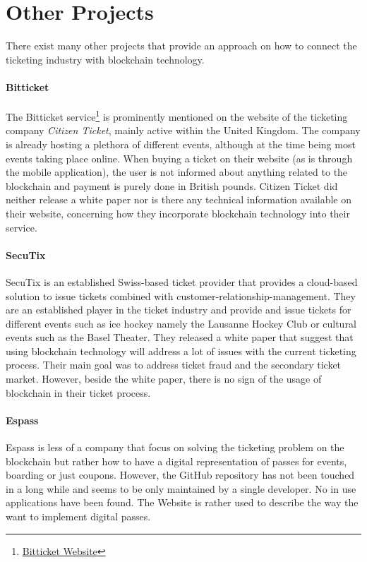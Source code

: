 \section{Other Projects}

There exist many other projects that provide an approach on how to connect the ticketing industry with blockchain technology.

\paragraph{Bitticket}
The Bitticket service\footnote{\href{https://www.bitticket.io}{Bitticket Website}} is prominently mentioned on the website of the ticketing company \textit{Citizen Ticket}, mainly active within the United Kingdom. The company is already hosting a plethora of different events, although at the time being most events taking place online. When buying a ticket on their website (as is through the mobile application), the user is not informed about anything related to the blockchain and payment is purely done in British pounds. Citizen Ticket did neither release a white paper nor is there any technical information available on their website, concerning how they incorporate blockchain technology into their service.

\paragraph{SecuTix}
SecuTix\cite{SECUTIX} is an established Swiss-based ticket provider that provides a cloud-based solution to issue tickets combined with customer-relationship-management. They are an established player in the ticket industry and provide and issue tickets for different events such as ice hockey namely the Lausanne Hockey Club or cultural events such as the Basel Theater. They released a white paper that suggest that using blockchain technology will address a lot of issues with the current ticketing process. Their main goal was to address ticket fraud and the secondary ticket market. However, beside the white paper, there is no sign of the usage of blockchain in their ticket process.

\paragraph{Espass} 
Espass\cite{espass} is less of a company that focus on solving the ticketing problem on the blockchain but rather how to have a digital representation of passes for events, boarding or just coupons. However, the GitHub repository has not been touched in a long while and seems to be only maintained by a single developer. No in use applications have been found. The Website is rather used to describe the way the want to implement digital passes.  

